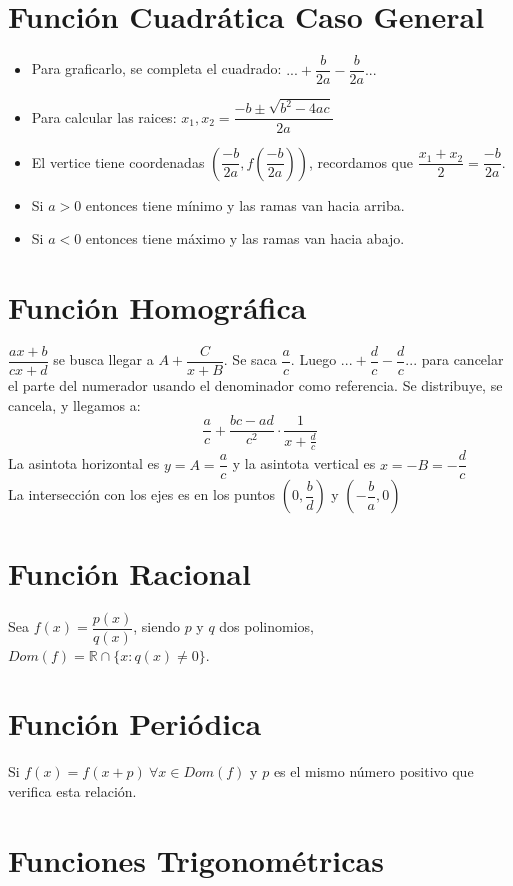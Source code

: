 \documentclass[11pt,a4paper]{article}
\begin{document}
\section{Funci\'on Cuadr\'atica Caso General}
\begin{itemize}
\item Para graficarlo, se completa el cuadrado: $... + \dfrac{b}{2a} - \dfrac{b}{2a}...$
\item Para calcular las raices: $x_1, x_2 = \dfrac{-b \pm \sqrt{b^2 - 4ac}}{2a}$
\item El vertice tiene coordenadas $\left(\dfrac{-b}{2a}, f(\dfrac{-b}{2a})\right)$, recordamos que $\dfrac{x_1 + x_2}{2} = \dfrac{-b}{2a}$.
\item Si $a > 0$ entonces tiene m\'inimo y las ramas van hacia arriba.
\item Si $a < 0$ entonces tiene m\'aximo y las ramas van hacia abajo.
\end{itemize}

\section{Funci\'on Homogr\'afica}
$\dfrac{ax+b}{cx+d}$ se busca llegar a $A + \dfrac{C}{x+B}$. Se saca $\dfrac{a}{c}$. Luego $...+\dfrac{d}{c}-\dfrac{d}{c}...$ para cancelar el parte del numerador usando el denominador como referencia. Se distribuye, se cancela, y llegamos a:
$$\dfrac{a}{c} + \dfrac{bc-ad}{c^2} \cdot \dfrac{1}{x + \frac{d}{c}}$$
La asintota horizontal es $y = A = \dfrac{a}{c}$ y la asintota vertical es $x = -B = -\dfrac{d}{c}$\\

La intersecci\'on con los ejes es en los puntos $(0, \dfrac{b}{d})$ y $(-\dfrac{b}{a}, 0)$


\section{Funci\'on Racional}
Sea $f(x) = \dfrac{p(x)}{q(x)}$, siendo $p$ y $q$ dos polinomios, $Dom(f) = \mathbb{R} \cap \{x:q(x)\not = 0\}$.

\newpage

\section{Funci\'on Peri\'odica}
Si $f(x) = f(x + p)\ \forall x \in Dom(f)$ y $p$ es el mismo n\'umero positivo que verifica esta relaci\'on.

\section{Funciones Trigonom\'etricas}
\end{document}
